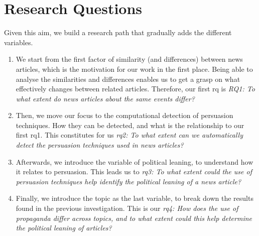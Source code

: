 






\section{\statusgreen Research Questions}
\label{sec:intro_rqs}

Given this aim, we build a research path that gradually adds the different variables.

\begin{enumerate}
    \item We start from the first factor of similarity (and differences) between news articles, which is the motivation for our work in the first place. Being able to analyse the similarities and differences enables us to get a grasp on what effectively changes between related articles. Therefore, our first \acrfull{rq} is \emph{RQ1: To what extent do news articles about the same events differ?}
    \item Then, we move our focus to the computational detection of persuasion techniques. How they can be detected, and what is the relationship to our first \acrshort{rq}1. This constitutes for us \emph{\acrshort{rq}2: To what extent can we automatically detect the persuasion techniques used in news articles?} 
    \item Afterwards, we introduce the variable of political leaning, to understand how it relates to persuasion. This leads us to \emph{\acrshort{rq}3: To what extent could the use of persuasion techniques help identify the political leaning of a news article?}
    \item Finally, we introduce the topic as the last variable, to break down the results found in the previous investigation. This is our \emph{\acrshort{rq}4: How does the use of propaganda differ across topics, and to what extent could this help determine the political leaning of articles?}
\end{enumerate}

